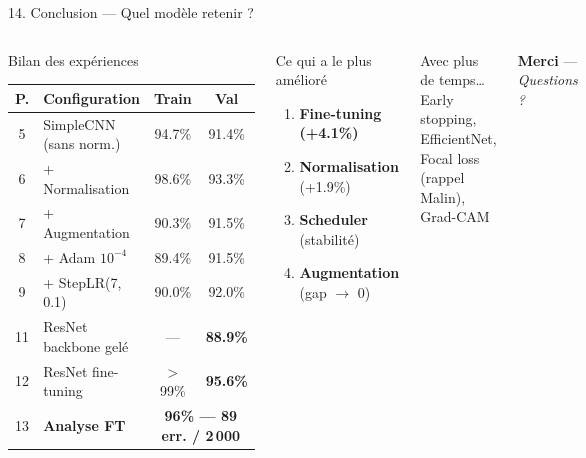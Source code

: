 \documentclass[aspectratio=169]{beamer}
\newcommand{\good}[1]{\textcolor{green!55!black}{\textbf{#1}}}
\newcommand{\warn}[1]{\textcolor{orange!80!black}{\textbf{#1}}}
\begin{document}
\begin{frame}{14. Conclusion --- Quel modèle retenir ?}
  \begin{columns}[T,onlytextwidth]
      \begin{block}{Bilan des expériences}
        \tiny\renewcommand{\arraystretch}{1.15}
        \begin{tabular}{clcc}
          \toprule \textbf{P.} & \textbf{Configuration} & \textbf{Train} & \textbf{Val} \\ \midrule
          5  & SimpleCNN (sans norm.)  & 94.7\% & 91.4\% \\
          6  & + Normalisation         & 98.6\% & 93.3\% \\
          7  & + Augmentation          & 90.3\% & 91.5\% \\
          8  & + Adam $10^{-4}$        & 89.4\% & 91.5\% \\
          9  & + StepLR(7, 0.1)        & 90.0\% & 92.0\% \\
          11 & ResNet backbone gelé    & ---    & \warn{88.9\%} \\
          12 & ResNet fine-tuning      & $>$99\%& \good{\textbf{95.6\%}} \\ \midrule
          13 & \textbf{Analyse FT} &
            \multicolumn{2}{c}{\good{\textbf{96\% --- 89 err. / 2\,000}}} \\
          \bottomrule
        \end{tabular}
      \end{block}
      \begin{block}{Ce qui a le plus amélioré}
        \small
        \begin{enumerate}\setlength\itemsep{4pt}
          \item \textbf{Fine-tuning} \good{(+4.1\%)}
          \item \textbf{Normalisation} (+1.9\%)
          \item \textbf{Scheduler} (stabilité)
          \item \textbf{Augmentation} (gap $\to$ 0)
        \end{enumerate}
      \end{block}
      \vspace{3pt}
      \begin{block}{Avec plus de temps\ldots}
        \small Early stopping, EfficientNet, Focal loss (rappel Malin), Grad-CAM
      \end{block}
      \vspace{4pt}
      \begin{alertblock}{}
        \centering \large\textbf{Merci} \normalsize --- \textit{Questions ?}
      \end{alertblock}
  \end{columns}
\end{frame}
\end{document}
